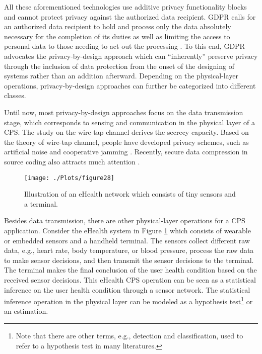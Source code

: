 \documentclass[g5paper,phd,electronic]{kthesis}
\numberwithin{theorem}{chapter}
\numberwithin{lemma}{chapter}
\numberwithin{proposition}{chapter}
\numberwithin{corollary}{chapter}
\numberwithin{remark}{chapter}
\numberwithin{property}{chapter}
\numberwithin{conjecture}{chapter}
\numberwithin{assumption}{chapter}
\numberwithin{algorithm}{chapter}
\begin{document}
All these aforementioned technologies use additive privacy functionality blocks and cannot protect privacy against the authorized data recipient. GDPR calls for an authorized data recipient to hold and process only the data absolutely necessary for the completion of its duties as well as limiting the access to personal data to those needing to act out the processing \cite{gdpr}. To this end, GDPR advocates the {\textit privacy-by-design} approach which can ``inherently'' preserve privacy through the inclusion of data protection from the onset of the designing of systems rather than an addition afterward. Depending on the physical-layer operations, privacy-by-design approaches can further be categorized into different classes.

Until now, most privacy-by-design approaches focus on the data transmission stage, which corresponds to sensing and communication in the physical layer of a CPS. The study on the wire-tap channel \cite{wyner1975} derives the secrecy capacity. Based on the theory of wire-tap channel, people have developed privacy schemes, such as artificial noise \cite{goel2008} and cooperative jamming \cite{tekin2007}. Recently, secure data compression in source coding also attracts much attention \cite{kitti2011}.

\begin{figure}[h]
\center
\texttt{[image: ./Plots/figure28]}
\caption{Illustration of an eHealth network which consists of tiny sensors and a terminal.}
\label{figure1.2}
\end{figure}

Besides data transmission, there are other physical-layer operations for a CPS application. Consider the eHealth system in Figure \ref{figure1.2} which consists of wearable or embedded sensors and a handheld terminal. The sensors collect different raw data, e.g., heart rate, body temperature, or blood pressure, process the raw data to make sensor decisions, and then transmit the sensor decisions to the terminal. The terminal makes the final conclusion of the user health condition based on the received sensor decisions. This eHealth CPS operation can be seen as a statistical inference on the user health condition through a sensor network. The statistical inference operation in the physical layer can be modeled as a { hypothesis test}\footnote{Note that there are other terms, e.g., { detection} and { classification}, used to refer to a hypothesis test in many literatures.} or an estimation.
\end{document}
